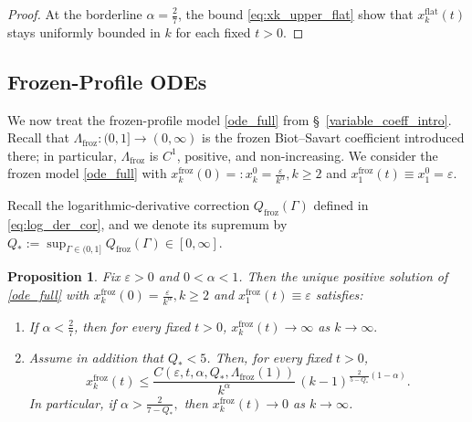 \documentclass[reqno,11pt]{amsart}
\newtheorem{proposition}[theorem]{Proposition}
\begin{document}
\begin{proof}
At the borderline $\alpha=\frac27$, the bound
\eqref{eq:xk_upper_flat} show that $x_k^{\mathrm{flat}}(t)$ stays uniformly bounded in $k$
for each fixed $t>0$.
\end{proof}

\subsection{Frozen-Profile ODEs}
\label{frozen_pro_ODE_appdx}

We now treat the frozen-profile model \eqref{ode_full}
from \S~\ref{variable_coeff_intro}. Recall that
$\Lambda_{\mathrm{froz}}:(0,1]\to(0,\infty)$ is the frozen Biot--Savart coefficient introduced
there; in particular, $\Lambda_{\mathrm{froz}}$ is $C^1$, positive, and non-increasing.  We consider the frozen model \eqref{ode_full} with $x_k^{\mathrm{froz}}(0)=:x_k^0=\frac{\varepsilon}{k^\alpha}, k\geq 2$ and $x_1^{\mathrm{froz}}(t)\equiv x_1^0=\varepsilon$.

Recall the logarithmic-derivative correction $Q_{\mathrm{froz}}(\Gamma)$ defined in \eqref{eq:log_der_cor}, and we denote its supremum by $Q_*:=\sup_{\Gamma\in(0,1]}Q_{\mathrm{froz}}(\Gamma)\in[0,\infty].$

\begin{proposition}
Fix $\varepsilon>0$ and $0<\alpha<1$. Then the unique positive solution of
\eqref{ode_full} with $x_k^{\mathrm{froz}}(0)=\frac{\varepsilon}{k^\alpha}, k\geq 2$ and $x_1^{\mathrm{froz}}(t)\equiv\varepsilon$ satisfies:
\begin{enumerate}
\item If $\alpha<\frac27$, then for every fixed $t>0$, $x_k^{\mathrm{froz}}(t)\to\infty$ as $k\to\infty.$
\item Assume in addition that $Q_*<5$. Then,
for every fixed $t>0$,
\begin{equation}
\label{eq:xk_upper_frozen}
x_k^{\mathrm{froz}}(t)
\le
\frac{C(\varepsilon,t,\alpha,Q_*,\Lambda_{\mathrm{froz}}(1))}{k^\alpha}\,
(k-1)^{\frac{2}{5-Q_*}(1-\alpha)}.
\end{equation}
In particular, if $\alpha>\frac{2}{7-Q_*},$
then $x_k^{\mathrm{froz}}(t)\to0$ as $k\to\infty$.
\end{enumerate}
\end{proposition}
\end{document}

